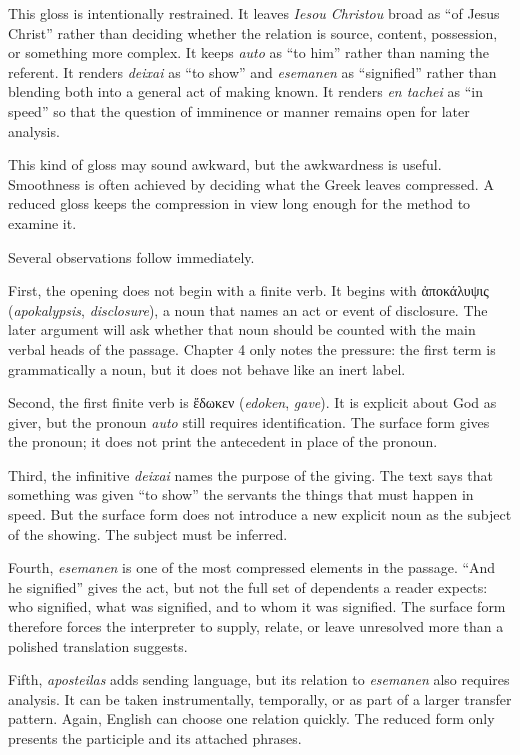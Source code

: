 This gloss is intentionally restrained. It leaves \textit{Iesou Christou} broad as ``of Jesus Christ'' rather than deciding whether the relation is source, content, possession, or something more complex. It keeps \textit{auto} as ``to him'' rather than naming the referent. It renders \textit{deixai} as ``to show'' and \textit{esemanen} as ``signified'' rather than blending both into a general act of making known. It renders \textit{en tachei} as ``in speed'' so that the question of imminence or manner remains open for later analysis.

This kind of gloss may sound awkward, but the awkwardness is useful. Smoothness is often achieved by deciding what the Greek leaves compressed. A reduced gloss keeps the compression in view long enough for the method to examine it.

Several observations follow immediately.

First, the opening does not begin with a finite verb. It begins with \textgreek{ἀποκάλυψις} (\textit{apokalypsis}, \textit{disclosure}), a noun that names an act or event of disclosure. The later argument will ask whether that noun should be counted with the main verbal heads of the passage. Chapter 4 only notes the pressure: the first term is grammatically a noun, but it does not behave like an inert label.

Second, the first finite verb is \textgreek{ἔδωκεν} (\textit{edoken}, \textit{gave}). It is explicit about God as giver, but the pronoun \textit{auto} still requires identification. The surface form gives the pronoun; it does not print the antecedent in place of the pronoun.

Third, the infinitive \textit{deixai} names the purpose of the giving. The text says that something was given ``to show'' the servants the things that must happen in speed. But the surface form does not introduce a new explicit noun as the subject of the showing. The subject must be inferred.

Fourth, \textit{esemanen} is one of the most compressed elements in the passage. ``And he signified'' gives the act, but not the full set of dependents a reader expects: who signified, what was signified, and to whom it was signified. The surface form therefore forces the interpreter to supply, relate, or leave unresolved more than a polished translation suggests.

Fifth, \textit{aposteilas} adds sending language, but its relation to \textit{esemanen} also requires analysis. It can be taken instrumentally, temporally, or as part of a larger transfer pattern. Again, English can choose one relation quickly. The reduced form only presents the participle and its attached phrases.

